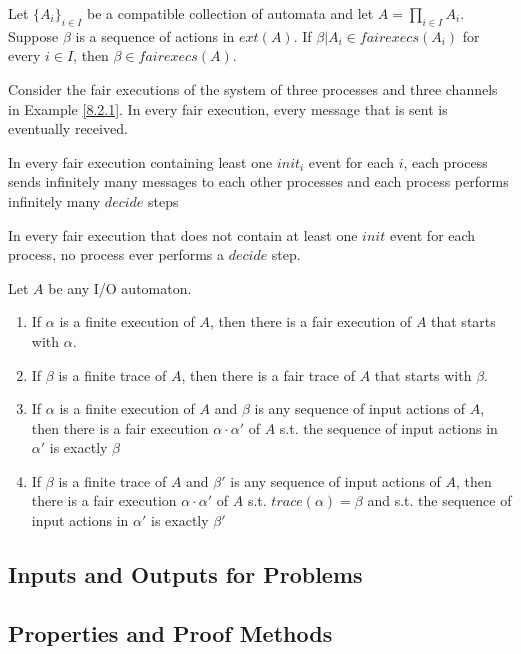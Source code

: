 \documentclass[11pt]{article}
\begin{document}
\begin{theorem}[]
Let \(\{A_i\}_{i\in I}\) be a compatible collection of automata and let \(A=\prod_{i\in I}A_i\).
Suppose \(\beta\) is a sequence of actions in \(ext(A)\). If \(\beta|A_i\in fairexecs(A_i)\)  for
every \(i\in I\), then \(\beta\in fairexecs(A)\).
\end{theorem}

\begin{examplle}[Fairness]
Consider the fair executions of the system of three processes and three channels in Example \ref{8.2.1}.
In every fair execution, every message that is sent is eventually received.

In every fair execution containing least one \(init_i\) event for each \(i\), each process sends
infinitely many messages to each other processes and each process performs infinitely many \(decide\) steps

In every fair execution that does not contain at least one \(init\) event for each process, no process
ever performs a \(decide\) step.
\end{examplle}

\begin{theorem}[]
Let \(A\) be any I/O automaton.
\begin{enumerate}
\item If \(\alpha\) is a finite execution of \(A\), then there is a fair execution of \(A\) that starts
with \(\alpha\).
\item If \(\beta\) is a finite trace of \(A\), then there is a fair trace of \(A\) that starts with \(\beta\).
\item If \(\alpha\) is a finite execution of \(A\) and \(\beta\) is any sequence of input actions of
\(A\), then there is a fair execution \(\alpha\cdot\alpha'\) of \(A\) s.t. the sequence of input
actions in \(\alpha'\) is exactly \(\beta\)
\item If \(\beta\) is a finite trace of \(A\) and \(\beta'\) is any sequence of input actions of \(A\),
then there is a fair execution \(\alpha\cdot\alpha'\) of \(A\) s.t. \(trace(\alpha)=\beta\) and
s.t. the sequence of input actions in \(\alpha'\) is exactly \(\beta'\)
\end{enumerate}
\end{theorem}
\subsection{Inputs and Outputs for Problems}
\label{sec:orgd9c68b6}
\subsection{Properties and Proof Methods}
\label{sec:org7c3b337}
\end{document}
